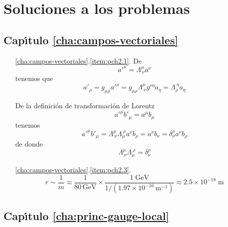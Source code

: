 \appendix

\chapter{Soluciones a los problemas}

\section*{Cap\'\i tulo \ref{cha:campos-vectoriales}}

\begin{itemize}
\item[\ref{cha:campos-vectoriales}.\ref{item:pch2.1}.] De
\begin{equation}
  {a'}^\mu=\Lambda^{\mu}_{\ \nu}a^\nu
\end{equation}
tenemos que
\begin{equation}
  {a'}_\rho=g_{\mu\rho}{a'}^\rho=g_{\mu\rho}\Lambda^{\mu}_{\ \nu}g^{\nu\eta}a_\eta=\Lambda^{\ \eta}_{\rho}a_\eta
\end{equation}

De la definici\'on de transformaci\'on de Lorentz
\begin{equation}
  {a'}^{\mu}{b'}_\mu=a^{\mu}b_\mu
\end{equation}
tenemos
\begin{equation}
   {a'}^{\mu}{b'}_\mu=\Lambda^{\mu}_{\ \nu}\Lambda_{\mu}^{\ \rho}a^{\nu}b_\rho=a^\nu b_\nu=\delta^\rho_\nu a^\nu b_\rho
\end{equation}
de donde
\begin{equation}
  \Lambda^{\mu}_{\ \nu}\Lambda_{\mu}^{\ \rho}=\delta^\rho_\nu
\end{equation}

\item[\ref{cha:campos-vectoriales}.\ref{item:pch2.3}.] 
\begin{equation}
  r\sim\frac{1}{m}\approx\frac{1}{80\,\text{GeV}}\times\frac{1\;\text{GeV}}{1/(1.97\times10^{-16}\,\text{m}^{-1})}\approx2.5\times10^{-18}\;\text{m}
\end{equation}

\end{itemize}

\section*{Cap\'\i tulo \ref{cha:princ-gauge-local}}

